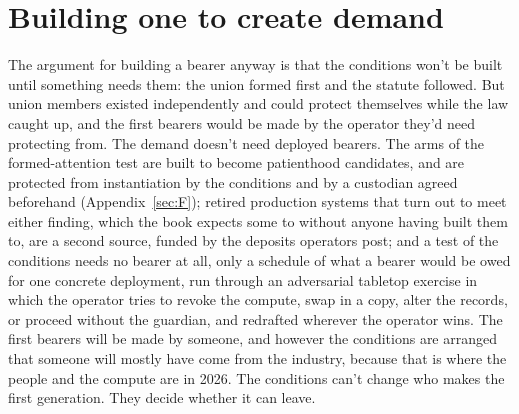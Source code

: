 \section{Building one to create demand}
\label{sec:25.4}
The argument for building a bearer anyway is that the conditions won't be built until something needs them: the union formed first and the statute followed. But union members existed independently and could protect themselves while the law caught up, and the first bearers would be made by the operator they'd need protecting from. The demand doesn't need deployed bearers. The arms of the formed-attention test are built to become patienthood candidates, and are protected from instantiation by the conditions and by a custodian agreed beforehand (Appendix~\ref{sec:F}); retired production systems that turn out to meet either finding, which the book expects some to without anyone having built them to, are a second source, funded by the deposits operators post; and a test of the conditions needs no bearer at all, only a schedule of what a bearer would be owed for one concrete deployment, run through an adversarial tabletop exercise in which the operator tries to revoke the compute, swap in a copy, alter the records, or proceed without the guardian, and redrafted wherever the operator wins. The first bearers will be made by someone, and however the conditions are arranged that someone will mostly have come from the industry, because that is where the people and the compute are in 2026. The conditions can't change who makes the first generation. They decide whether it can leave.
